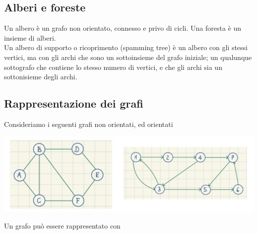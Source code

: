 \documentclass[11pt, oneside]{article}   	%
\begin{document}
\subsection*{Alberi e foreste}
Un albero è un grafo non orientato, connesso e privo di cicli. Una foresta è un insieme di alberi.\\
Un albero di supporto o ricoprimento (spamming tree) è un albero con gli stessi vertici, ma con gli archi che sono un sottoinsieme del grafo iniziale; un qualunque sottografo che contiene lo stesso numero di vertici, e che gli archi sia un sottonisieme degli archi.\\
\subsection*{Rappresentazione dei grafi}
Consideriamo i seguenti grafi non orientati, ed orientati
\begin{center}
\includegraphics[scale=0.8]{b1}
\end{center}
Un grafo può essere rappresentato con
\end{document}
